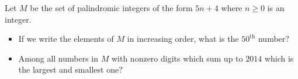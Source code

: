 Let $M$ be the set of palindromic integers of the form $5n+4$ where $n\ge 0$ is an integer.
\begin{itemize}
	\item If we write the elements of $M$ in increasing order, what is the $50^{\text{th}}$ number?
	\item Among all numbers in $M$ with nonzero digits which sum up to $2014$ which is the largest and smallest one?
\end{itemize}
